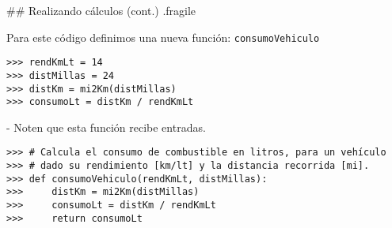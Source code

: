 \trmcolumns

## Realizando cálculos (cont.) {.fragile}

\vspace*{-3ex}
\bgncolumns


\bgnblocknormal
Para este código definimos una nueva función: \texttt{consumoVehiculo}
\trmblocknormal


\begin{lstlisting}
>>> rendKmLt = 14
>>> distMillas = 24
>>> distKm = mi2Km(distMillas)
>>> consumoLt = distKm / rendKmLt
\end{lstlisting}

\trmcolumns

\vfill

- Noten que esta función recibe  entradas.

\vfill

\begin{lstlisting}[style=frame01]
>>> # Calcula el consumo de combustible en litros, para un vehículo
>>> # dado su rendimiento [km/lt] y la distancia recorrida [mi].
>>> def consumoVehiculo(rendKmLt, distMillas):
>>>     distKm = mi2Km(distMillas)
>>>     consumoLt = distKm / rendKmLt
>>>     return consumoLt
\end{lstlisting}

